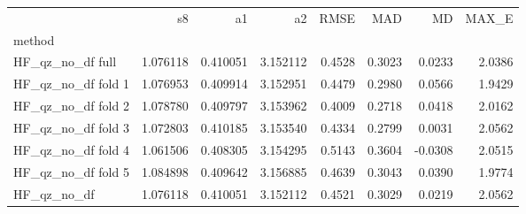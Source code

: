 \begin{tabular}{lrrrrrrr}
 & s8 & a1 & a2 & RMSE & MAD & MD & MAX_E \\
method &  &  &  &  &  &  &  \\
HF_qz_no_df full & 1.076118 & 0.410051 & 3.152112 & 0.4528 & 0.3023 & 0.0233 & 2.0386 \\
HF_qz_no_df fold 1 & 1.076953 & 0.409914 & 3.152951 & 0.4479 & 0.2980 & 0.0566 & 1.9429 \\
HF_qz_no_df fold 2 & 1.078780 & 0.409797 & 3.153962 & 0.4009 & 0.2718 & 0.0418 & 2.0162 \\
HF_qz_no_df fold 3 & 1.072803 & 0.410185 & 3.153540 & 0.4334 & 0.2799 & 0.0031 & 2.0562 \\
HF_qz_no_df fold 4 & 1.061506 & 0.408305 & 3.154295 & 0.5143 & 0.3604 & -0.0308 & 2.0515 \\
HF_qz_no_df fold 5 & 1.084898 & 0.409642 & 3.156885 & 0.4639 & 0.3043 & 0.0390 & 1.9774 \\
HF_qz_no_df & 1.076118 & 0.410051 & 3.152112 & 0.4521 & 0.3029 & 0.0219 & 2.0562 \\
\end{tabular}
